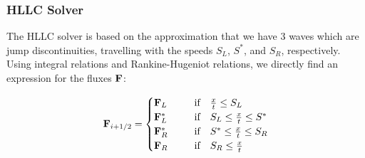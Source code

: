 %
%
%
%
%
%
%
%
%
%










\subsubsection{HLLC Solver}\label{chap:riemann-hllc}


The HLLC solver is based on the approximation that we have 3 waves which are
jump discontinuities, travelling with the speeds $S_L$, $S^*$, and $S_R$,
respectively. Using integral relations and Rankine-Hugeniot relations, we
directly find an expression for the fluxes $\mathbf{F}$:


\begin{align}
\mathbf{F}_{i+1/2} = \begin{cases}
	\mathbf{F}_L ~~~~ &\text{ if }		~~	\frac{x}{t} \leq S_L \\
	\mathbf{F}^*_L ~~~~ &\text{ if }	~~  S_L \leq \frac{x}{t} \leq S^* \\
	\mathbf{F}^*_R ~~~~ &\text{ if }	~~	S^* \leq \frac{x}{t} \leq S_R \\
	\mathbf{F}_R ~~~~ &\text{ if }		~~	S_R \leq \frac{x}{t} \\
\end{cases}
\end{align}

